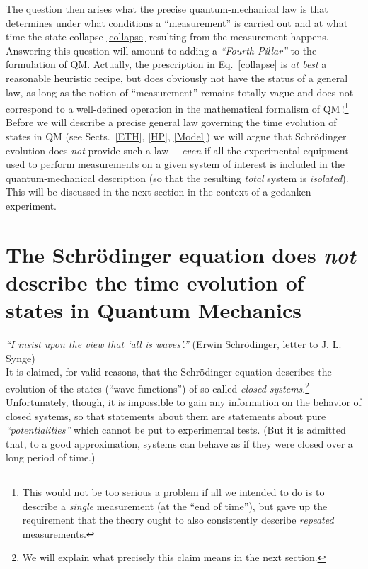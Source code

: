 \documentclass[12pt]{article}
\begin{document}
The question then arises what the precise quantum-mechanical law is that determines under what conditions a ``measurement'' is carried out and at what time the state-collapse \eqref{collapse} resulting from the measurement happens. 
Answering this question will amount to adding a \textit{``Fourth Pillar''} to the formulation of QM. Actually, the prescription 
in Eq.~\eqref{collapse} is \textit{at best} a reasonable heuristic recipe, but does obviously not have the status of a general law, 
as long as the notion of ``measurement'' remains totally vague and does not correspond to a well-defined operation in 
the mathematical formalism of QM\,!\footnote{This would not be too serious a problem if all we intended to do is to describe 
a \textit{single} measurement (at the ``end of time''), but gave up the requirement that the theory ought to also consistently 
describe \textit{repeated} measurements.} Before we will describe a precise general law governing the time evolution 
of states in QM (see Sects.~\ref{ETH}, \ref{HP}, \ref{Model}) we will argue that Schr\"odinger evolution does \textit{not} 
provide such a \mbox{law --} \textit{even} if all the experimental equipment used to perform measurements on a given 
system of interest is included in the quantum-mechanical description (so that the resulting \textit{total} system is \textit{isolated}). This will be discussed in the next section in the context of a gedanken experiment.
\newpage

\section{The Schr\"odinger equation does \textit{not} describe the time evolution of states in Quantum Mechanics}\label{Schroedinger evol}
\hspace{0.5cm}\textit{``I insist upon the view that `all is waves'.''} (Erwin Schr\"odinger, letter to J. L. Synge)\\

It is claimed, for valid reasons, that the Schr\"odinger equation describes the evolution of the states 
(``wave functions'') of so-called \textit{closed systems}.\footnote{We will explain what precisely this claim means in the next section.} 
 Unfortunately, though, it is impossible to gain any information on the behavior of closed systems, so that 
statements about them are statements about pure \textit{``potentialities''} which cannot be put to experimental tests. 
(But it is admitted that, to a good approximation, systems can behave as if they were closed over a long period of time.)
\end{document}
